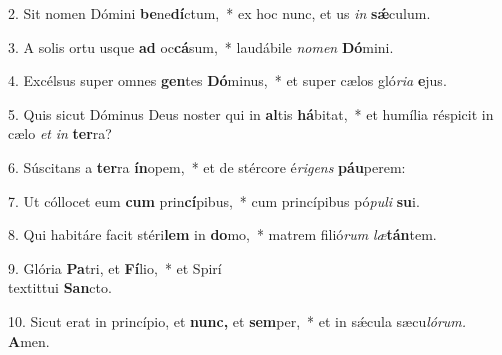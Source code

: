 \item 2. Sit nomen Dómini \textbf{be}ne\textbf{dí}ctum,~* ex hoc nunc, et us\hspace{0.03emque} \textit{in} \textbf{sǽ}culum.
\item 3. A solis ortu usque \textbf{ad} oc\textbf{cá}sum,~* laudábile \textit{nomen} \textbf{Dó}mini.
\item 4. Excélsus super omnes \textbf{gen}tes \textbf{Dó}minus,~* et super cælos gló\textit{ria} \textbf{e}jus.
\item 5. Quis sicut Dóminus Deus noster qui in \textbf{al}tis \textbf{há}bitat,~* et humília réspicit in cælo \textit{et} \textit{in} \textbf{ter}ra?
\item 6. Súscitans a \textbf{ter}ra \textbf{ín}opem,~* et de stércore é\textit{rigens} \textbf{páu}perem:
\item 7. Ut cóllocet eum \textbf{cum} prin\textbf{cí}pibus,~* cum princípibus pó\textit{puli} \textbf{su}i.
\item 8. Qui habitáre facit stéri\textbf{lem} in \textbf{do}mo,~* matrem filió\textit{rum} \textit{læ}\textbf{tán}tem.
\item 9. Glória \textbf{Pa}tri, et \textbf{Fí}lio,~* et Spirí\hspace{0.03em}\\textit{tui} \textbf{San}cto.
\item 10. Sicut erat in princípio, et \textbf{nunc,} et \textbf{sem}per,~* et in sǽcula sæcu\hspace{0.03em}\textit{lórum.} \textbf{A}men.
